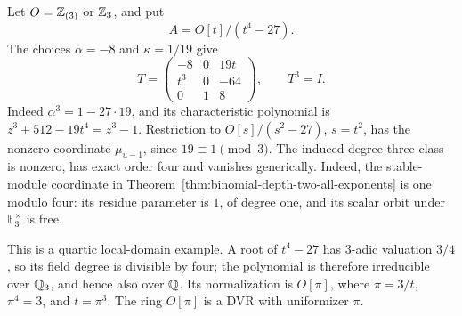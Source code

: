 \begin{example}\label{ex:quartic-binomial-order}
Let $O=\mathbb Z_{(3)}$ or $\mathbb Z_3$, and put
\[
 A=O[t]/(t^4-27).
\]
The choices $\alpha=-8$ and $\kappa=1/19$ give
\[
 T=\begin{pmatrix}
 -8&0&19t\\
 t^3&0&-64\\
 0&1&8
 \end{pmatrix},\qquad T^3=I.
\]
Indeed $\alpha^3=1-27\cdot19$, and its characteristic polynomial
is $z^3+512-19t^4=z^3-1$.  Restriction to
$O[s]/(s^2-27)$, $s=t^2$, has the nonzero coordinate $\mu_{u-1}$,
since $19\equiv1\pmod3$.  The induced degree-three class is nonzero,
has exact order four and vanishes generically.  Indeed, the
stable-module coordinate in Theorem~\ref{thm:binomial-depth-two-all-exponents}
is one modulo four: its residue parameter is $1$, of degree one,
and its scalar orbit under $\mathbb F_3^\times$ is free.

This is a quartic local-domain example.  A root of $t^4-27$ has
$3$-adic valuation $3/4$, so its field degree is divisible by four;
the polynomial is therefore irreducible over $\mathbb Q_3$, and hence also
over $\mathbb Q$.  Its normalization is $O[\pi]$, where
$\pi=3/t$, $\pi^4=3$, and $t=\pi^3$.  The ring $O[\pi]$ is a DVR
with uniformizer $\pi$.
\end{example}

